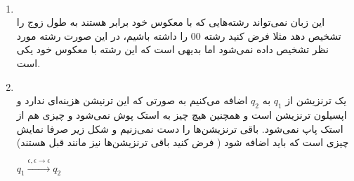 \\
\begin{enumerate}
    \item \phantom{text}
          \\
          این زبان نمی‌تواند رشته‌هایی که با معکوس خود برابر هستند به طول زوج را تشخیص دهد مثلا فرض کنید
          رشته 00 را داشته باشیم، در این صورت رشته مورد نظر
          تشخیص داده نمی‌شود اما بدیهی است که این رشته با معکوس خود
          یکی است.
    \item \phantom{text}
          \\
          یک ترنزیشن از $q_1$ به $q_2$ اضافه می‌کنیم به صورتی که
          این ترنیشن هزینه‌ای ندارد و اپسیلون ترنزیشن است و همچنین 
          هیچ چیز به استک پوش نمی‌شود و چیزی هم از استک پاپ
          نمی‌شود.
          باقی ترنزیشن‌ها را دست نمی‌زنیم و شکل زیر صرفا نمایش چیزی است که باید اضافه شود ( فرض کنید باقی ترنزیشن‌ها نیز مانند قبل هستند)
          \begin{latin}
            $q_1 \xrightarrow[]{\epsilon,\epsilon\rightarrow\epsilon}q_2$
        \end{latin}
        \begin{latin}
            

            \noindent
          \end{latin}
\end{enumerate}